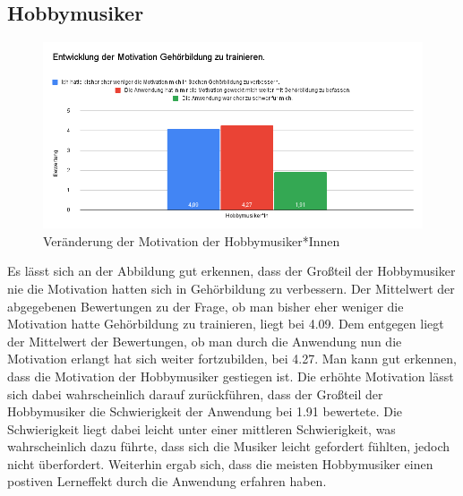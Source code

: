 \subsection*{Hobbymusiker}
\begin{figure}[H]
    \centering
    \includegraphics[width=1\textwidth]{Bilder/eval-entwicklungMotivationHobby-vergleich.png}
    \caption{Veränderung der Motivation der Hobbymusiker*Innen}
\end{figure}
Es lässt sich an der Abbildung gut erkennen, dass der Großteil der Hobbymusiker nie die Motivation hatten sich in Gehörbildung zu verbessern. Der Mittelwert der abgegebenen Bewertungen zu der Frage, ob man bisher eher weniger die Motivation hatte Gehörbildung zu trainieren, liegt bei 4.09. Dem entgegen liegt der Mittelwert der Bewertungen, ob man durch die Anwendung nun die Motivation erlangt hat sich weiter fortzubilden, bei 4.27. Man kann gut erkennen, dass die Motivation der Hobbymusiker gestiegen ist. Die erhöhte Motivation lässt sich dabei wahrscheinlich darauf zurückführen, dass der Großteil der Hobbymusiker die Schwierigkeit der Anwendung bei 1.91 bewertete. Die Schwierigkeit liegt dabei leicht unter einer mittleren Schwierigkeit, was wahrscheinlich dazu führte, dass sich die Musiker leicht gefordert fühlten, jedoch nicht überfordert. Weiterhin ergab sich, dass die meisten Hobbymusiker einen postiven Lerneffekt durch die Anwendung erfahren haben.  


